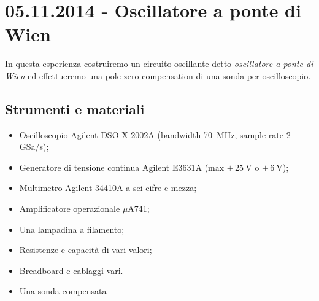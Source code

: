 \section{05.11.2014 - Oscillatore a ponte di Wien}

In questa esperienza costruiremo un circuito oscillante detto \textit{oscillatore a ponte di Wien} ed effettueremo una pole-zero compensation di una sonda per oscilloscopio.

\subsection*{Strumenti e materiali}

\begin{itemize} [noitemsep]
	\item Oscilloscopio Agilent DSO-X 2002A (bandwidth \SI{70}{\mega\hertz}, sample rate \num{2} GSa/s);%
		\item Generatore di tensione continua Agilent E3631A (max $\pm \, \SI{25}{\volt}$ o $\pm \, \SI{6}{\volt}$);
		\item Multimetro Agilent 34410A a sei cifre e mezza;
		\item Amplificatore operazionale $\mu$A741;
		\item Una lampadina a filamento;
		\item Resistenze e capacità di vari valori;
		\item Breadboard e cablaggi vari.
		\item Una sonda compensata
\end{itemize}

